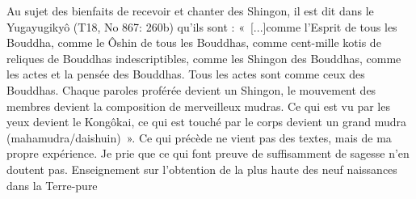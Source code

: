 Au sujet des bienfaits de recevoir et chanter des Shingon, il est dit dans le Yugayugikyô (T18, No 867: 260b) qu'ils sont :
« [...]comme l'Esprit de tous les Bouddha, comme le Ôshin de tous les Bouddhas, comme cent-mille kotis de reliques de Bouddhas indescriptibles, comme les Shingon des Bouddhas, comme les actes et la pensée des Bouddhas. Tous les actes sont comme ceux des Bouddhas. Chaque paroles proférée devient un Shingon, le mouvement des membres devient la composition de merveilleux mudras. Ce qui est vu par les yeux devient le Kongôkai, ce qui est touché par le corps devient un grand mudra (mahamudra/daishuin) ». 
Ce qui précède ne vient pas des textes, mais de ma propre expérience. Je prie que ce qui font preuve de suffisamment de sagesse n'en doutent pas.
Enseignement sur l'obtention de la plus haute des neuf naissances dans la Terre-pure

